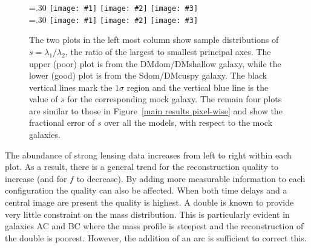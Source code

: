 \documentclass[galley,usenatbib]{mn2e}
\newcommand{\figref}[1] {Figure~\ref{#1}}
\newcommand\plotthree[3]{{%
 \centering
 \leavevmode
 \columnwidth=.30\textwidth
 \texttt{[image: \#1]}%
 \hfil
 \texttt{[image: \#2]}%
 \hfil
 \texttt{[image: \#3]}%
}}%
\begin{document}
\begin{figure}
\plotthree{AAExtendedDoubleR1_TmS-shape-hist-11.pdf} {AAferror_shape-1sig.pdf} {BBferror_shape-1sig.pdf}\\
\plotthree{BCZContrastR1R3_TmS-shape-hist-212.pdf} {ACferror_shape-1sig.pdf} {BCferror_shape-1sig.pdf}
\caption{ The two plots in the left most column show sample distributions of
  $s=\lambda_1/\lambda_2$, the ratio of the largest to smallest principal axes.
  The upper (poor) plot is from the DMdom/DMshallow galaxy, while the lower (good) plot is
  from the Sdom/DMcuspy galaxy. The black vertical lines mark the $1\sigma$
  region and the vertical blue line is the value of $s$ for the corresponding
  mock galaxy. The remain four plots are similar to those in \figref{main
  results pixel-wise} and show the fractional error of $s$ over all the models,
with respect to the mock galaxies.}

\label{main results pixel-wise}
\end{figure}

The abundance of strong lensing data increases from left to right within each plot. As
a result, there is a general trend for the reconstruction quality to increase
(and for $f$ to decrease). By adding more measurable information to each
configuration the quality can also be affected. When both time delays and a
central image are present the quality is highest. A double is known to provide
very little constraint on the mass distribution. This is particularly evident in
galaxies AC and BC where the mass profile is steepest and the reconstruction of
the double is poorest. However, the addition of an arc is sufficient to correct
this.
\end{document}
